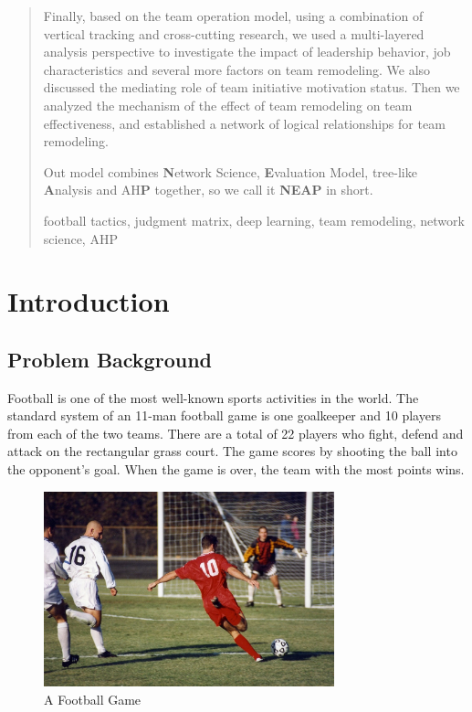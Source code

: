 \documentclass{mcmthesis}
\begin{document}
\begin{abstract}
Finally, based on the team operation model, using a combination of vertical tracking and cross-cutting research, we used a multi-layered analysis perspective to investigate the impact of leadership behavior, job characteristics and several more factors on team remodeling. We also discussed the mediating role of team initiative motivation status. Then we analyzed the mechanism of the effect of team remodeling on team effectiveness, and established a network of logical relationships for team remodeling.

Out model combines \textbf{N}etwork Science, \textbf{E}valuation Model, tree-like \textbf{A}nalysis and AH\textbf{P} together, so we call it \textbf{NEAP} in short.

	\begin{keywords}
		football tactics, judgment matrix, deep learning, team remodeling, network science, AHP
	\end{keywords}
\end{abstract}

\maketitle

\tableofcontents

\newpage

\section{Introduction}
\subsection{Problem Background}
	Football is one of the most well-known sports activities in the world.  The standard system of an 11-man football game is one goalkeeper and 10 players from each of the two teams. There are a total of 22 players who fight, defend and attack on the rectangular grass court.  The game scores by shooting the ball into the opponent's goal. When the game is over, the team with the most points wins.

	\begin{figure}[h]
		\centering
		\includegraphics[width=0.75\textwidth]{figures/football.jpg}
		\caption{A Football Game~\cite{Wiki_Football}}
		\label{fig:football}
	\end{figure}
\end{document}
